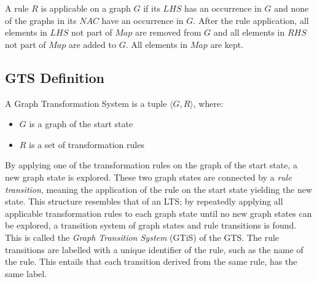 
A rule $R$ is applicable on a graph $G$ if its $\mathit{LHS}$ has an occurrence in $G$ and none of the graphs in its $\mathit{NAC}$ have an occurrence in $G$. After the rule application, all elements in $\mathit{LHS}$ not part of $\mathit{Map}$ are removed from $G$ and all elements in $\mathit{RHS}$ not part of $\mathit{Map}$ are added to $G$. All elements in $\mathit{Map}$ are kept.


\subsection{GTS Definition}
A Graph Transformation System is a tuple $\langle G, R\rangle$, where:
\begin{itemize}
  \item $G$ is a graph of the start state
  \item $R$ is a set of transformation rules
\end{itemize}

By applying one of the transformation rules on the graph of the start state, a new graph state is explored. These two graph states are connected by a \textit{rule transition}, meaning the application of the rule on the start state yielding the new state. This structure resembles that of an LTS; by repeatedly applying all applicable transformation rules to each graph state until no new graph states can be explored, a transition system of graph states and rule transitions is found. This is called the \textit{Graph Transition System} (GTiS) of the GTS. The rule transitions are labelled with a unique identifier of the rule, such as the name of the rule. This entails that each transition derived from the same rule, has the same label.

